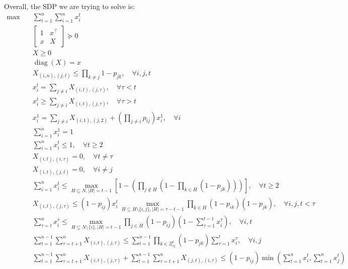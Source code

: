 \documentclass[10pt,leqno]{amsart}
\newcommand{\diag}{\operatorname{diag}}
\begin{document}
Overall, the SDP we are trying to solve is:
\begin{align*}
  \max\quad&\sum_{t=1}^{n}\sum_{i=1}^{n}x_i^t\\
  &\begin{bmatrix}
    1&x^\top \\
    x&X
  \end{bmatrix}\succeq 0\\
  &X\geq 0\\
  &\diag(X) = x\\
  &X_{(i,n),(j,t)}\leq \prod_{k\neq j}1-p_{jk},\quad\forall i,j,t\\
  &x_{i}^{t} = \sum_{j\neq i}X_{(i,t),(j,\tau)},\quad\forall \tau<t\\
  &x_{i}^{t} \geq \sum_{j\neq i}X_{(i,t),(j,\tau)},\quad\forall \tau>t\\
  &x_i^1 = \sum_{j\neq i}X_{(i,1),(j,2)} + \left(\prod_{j\neq i}p_{ij}\right)x_i^1,\quad \forall i\\
  &\sum_{i=1}^{n}x_i^1 = 1\\
  &\sum_{i=1}^{n}x_i^t \leq 1,\quad \forall t\geq 2\\
  & X_{(i,t),(i,\tau)} = 0,\quad\forall t\neq \tau\\
  & X_{(i,t),(j,t)} = 0,\quad\forall i\neq j\\
  &\sum_{i=1}^{n}x_i^t \leq \max_{H\subseteq N,|H|=t-1}\left[1-\left(\prod_{j\notin H}\left(1-\prod_{k\in H}(1-p_{jk})\right)\right)\right],\quad \forall t\geq 2\\ %
  &X_{(i,t),(j,\tau)}\leq (1-p_{ij})x_i^t~\max_{H\subseteq H\setminus\{i,j\},|H|=\tau-t-1}\prod_{k\in H}(1-p_{ik})(1-p_{jk}),\quad\forall i,j,t<\tau\\
  &\sum_{\tau=t}^{n}x_i^\tau\leq \max_{H\subseteq N\setminus\{i\},|H|=t-1}\prod_{j\in H}(1-p_{ij})\left(1-\sum_{\tau=1}^{t-1}x_i^\tau\right),\quad \forall i,t\\
  &\sum_{t=1}^{n-1}\sum_{\tau=t+1}^{n}X_{(i,t),(j,\tau)}\leq \sum_{t=1}^{n-1}\prod_{k\in\Xi_{ij}^{t}}(1-p_{jk})\sum_{\tau=1}^{t}x_i^\tau,\quad\forall i,j\\ %
  &\sum_{t=1}^{n-1}\sum_{\tau=t+1}^{n}X_{(i,t),(j,\tau)}+\sum_{t=1}^{n-1}\sum_{\tau=t+1}^{n}X_{(j,t),(i,\tau)}\leq (1-p_{ij})\min\left(\sum_{t=1}^{n}x_i^t,\sum_{t=1}^{n}x_j^t\right)
\end{align*}
\end{document}
